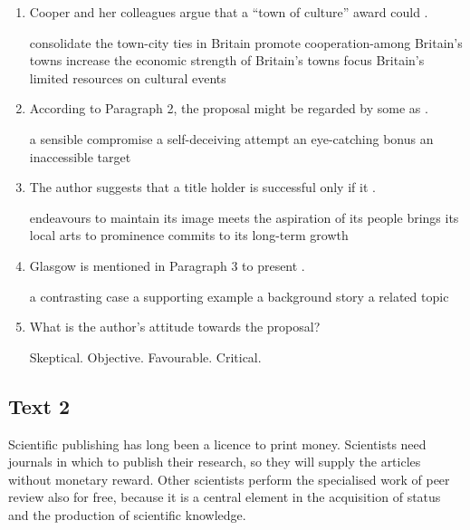 \begin{enumerate}[resume]
\item
Cooper and her colleagues argue that a ``town of culture'' award could  \lineread.




\fourchoices
{consolidate the town-city ties in Britain}
{promote cooperation-among Britain's towns}
{increase the economic strength of Britain's towns}
{focus Britain's limited resources on cultural events}



\item
 According to Paragraph 2, the proposal might be regarded by some as \lineread.


\fourchoices
{a sensible compromise}
{a self-deceiving attempt}
{an eye-catching bonus}
{an inaccessible target}



\item
The author suggests that a title holder is successful only if it \lineread.


\fourchoices
{endeavours to maintain its image}
{meets the aspiration of its people}
{brings its local arts to prominence}
{commits to its long-term growth}


\item
 Glasgow is mentioned in Paragraph 3 to present \lineread.


\fourchoices
{a contrasting case}
{a supporting example}
{a background story}
{a related topic}


\item
What is the author's attitude towards the proposal?


\fourchoices
{Skeptical.}
{Objective.}
{Favourable.}
{Critical.}


\end{enumerate}


\newpage
\subsection{Text 2}



Scientific publishing has long been a licence to print money. Scientists
need journals in which to publish their research, so they will supply
the articles without monetary reward. Other scientists perform the
specialised work of peer review also for free, because it is a central
element in the acquisition of status and the production of scientific
knowledge.

